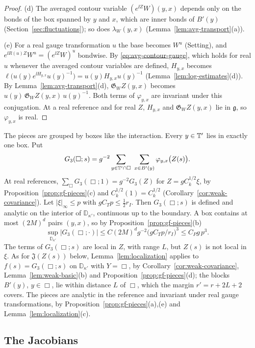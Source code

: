 \begin{proof}
(d) The averaged contour variable $(e^{\ii Z}W)(y,x)$ depends only on the bonds of the box spanned by $y$ and $x$, which are inner bonds of $B'(y)$ (Section~\ref{sec:fluctuations}); so does $\lambda_W(y,x)$ (Lemma~\ref{lem:avg-transport}(a)).

(e) For a real gauge transformation $u$ the base becomes $W^u$ (Setting), and $e^{\ii R(u)Z}W^u=(e^{\ii Z}W)^u$ bondwise. By \eqref{eq:avg-contour-gauge}, which holds for real $u$ whenever the averaged contour variables are defined, $H_{y,x}$ becomes $\ell\big(u(y)e^{\ii H_{y,x}}u(y)^{-1}\big)=u(y)H_{y,x}u(y)^{-1}$ (Lemma~\ref{lem:log-estimates}(d)). By Lemma~\ref{lem:avg-transport}(d), $\mathfrak G_WZ(y,x)$ becomes $u(y)\,\mathfrak G_WZ(y,x)\,u(y)^{-1}$. Both terms of $\varphi_{y,x}$ are invariant under this conjugation. At a real reference and for real $Z$, $H_{y,x}$ and $\mathfrak G_WZ(y,x)$ lie in $\mathfrak g$, so $\varphi_{y,x}$ is real.
\end{proof}

The pieces are grouped by boxes like the interaction. Every $y\in\mathbb T'$ lies in exactly one box. Put
\[
G_3(\Box;s)=g^{-2}\sum_{y\in\T'\cap\Box}\ \sum_{x\in B'(y)}\varphi_{y,x}\big(Z(s)\big).
\]
At real references, $\sum_\Box G_3(\Box;1)=g^{-2}G_3(Z)$ for $Z=gC_k^{1/2}\xi$, by Proposition~\ref{prop:gf-pieces}(c) and $C_k^{1/2}(1)=C_k^{1/2}$ (Corollary~\ref{cor:weak-covariance}). Let $|\xi|_\infty\le p$ with $gC_Tp\le\frac12r_I$. Then $G_3(\Box;s)$ is defined and analytic on the interior of $\mathbb D_{\kappa'}$, continuous up to the boundary. A box contains at most $(2M)^d$ pairs $(y,x)$, so by Proposition~\ref{prop:gf-pieces}(b)
\[
\sup_{\mathbb D_{\kappa'}}|G_3(\Box;\cdot)|\le C(2M)^dg^{-2}\big(gC_Tp/r_I\big)^3\le C_Pg\,p^3 .
\]
The terms of $G_3(\Box;s)$ are local in $Z$, with range $L$, but $Z(s)$ is not local in $\xi$. As for $\mathfrak J(Z(s))$ below, Lemma~\ref{lem:localization} applies to $f(s)=G_3(\Box;s)$ on $\mathbb D_{\kappa'}$ with $Y=\Box$, by Corollary~\ref{cor:weak-covariance}, Lemma~\ref{lem:weak-basic}(b) and Proposition~\ref{prop:gf-pieces}(d); the blocks $B'(y)$, $y\in\Box$, lie within distance $L$ of $\Box$, which the margin $r'=r+2L+2$ covers. The pieces are analytic in the reference and invariant under real gauge transformations, by Proposition~\ref{prop:gf-pieces}(a),(e) and Lemma~\ref{lem:localization}(c).

\subsection{The Jacobians}\label{subsec:sq-jacobians}

